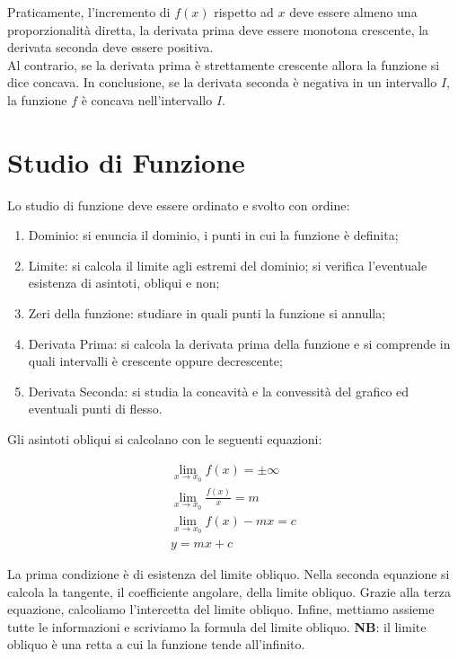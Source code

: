 \documentclass{article}
\begin{document}
Praticamente, l'incremento di $f(x)$ rispetto ad $x$ deve essere almeno una proporzionalità diretta, la derivata prima deve essere monotona crescente, la derivata seconda deve essere positiva.\\
Al contrario, se la derivata prima è strettamente crescente allora la funzione si dice concava. In conclusione, se la derivata seconda è negativa in un intervallo $I$, la funzione $f$ è concava nell'intervallo $I$.

\section{Studio di Funzione}

Lo studio di funzione deve essere ordinato e svolto con ordine:
\begin{enumerate}
	\item Dominio: si enuncia il dominio, i punti in cui la funzione è definita;

	\item Limite: si calcola il limite agli estremi del dominio; si verifica l'eventuale esistenza di asintoti, obliqui e non;

	\item Zeri della funzione: studiare in quali punti la funzione si annulla;

	\item Derivata Prima: si calcola la derivata prima della funzione e si comprende in quali intervalli è crescente oppure decrescente;

	\item Derivata Seconda: si studia la concavità e la convessità del grafico ed eventuali punti di flesso.
\end{enumerate}

Gli asintoti obliqui si calcolano con le seguenti equazioni:

\begin{gather}
	\lim_{x \to x_0}f(x)= \pm \infty \\
	\lim_{x \to x_0}\frac{f(x)}{x}= m \\
	\lim_{x \to x_0}f(x)- mx= c \\
	y= mx + c
\end{gather}

La prima condizione è di esistenza del limite obliquo. Nella seconda equazione si calcola la tangente, il coefficiente angolare, della limite obliquo. Grazie alla terza equazione, calcoliamo l'intercetta del limite obliquo. Infine, mettiamo assieme tutte le informazioni e scriviamo la formula del limite obliquo. \textbf{NB}: il limite obliquo è una retta a cui la funzione tende all'infinito.\\
\end{document}
